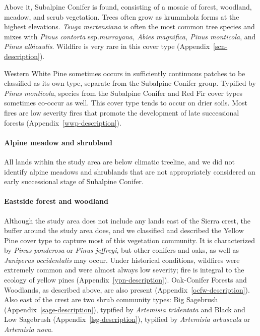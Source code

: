 Above it, Subalpine Conifer is found, consisting of a mosaic of forest, woodland, meadow, and scrub vegetation. Trees often grow as krummholz forms at the highest elevations. \emph{Tsuga mertensiana} is often the most common tree species and mixes with \emph{Pinus contorta} ssp.\@ \emph{murrayana, Abies magnifica, Pinus monticola}, and \emph{Pinus albicaulis}. Wildfire is very rare in this cover type (Appendix~\ref{scn-description}). 

Western White Pine sometimes occurs in sufficiently continuous patches to be classified as its own type, separate from the Subalpine Conifer group. Typified by \emph{Pinus monticola}, species from the Subalpine Conifer and Red Fir cover types sometimes co-occur as well. This cover type tends to occur on drier soils. Most fires are low severity fires that promote the development of late successional forests (Appendix~\ref{wwp-description}).


\paragraph{Alpine meadow and shrubland} All lands within the study area are below climatic treeline, and we did not identify alpine meadows and shrublands that are not appropriately considered an early successional stage of Subalpine Conifer.


\paragraph{Eastside forest and woodland} Although the study area does not include any lands east of the Sierra crest, the buffer around the study area does, and we classified and described the Yellow Pine cover type to capture most of this vegetation community. It is characterized by \emph{Pinus ponderosa} or \emph{Pinus jeffreyi}, but other conifers and oaks, as well as \emph{Juniperus occidentalis} may occur. Under historical conditions, wildfires were extremely common and were almost always low severity; fire is integral to the ecology of yellow pines (Appendix~\ref{ypn-description}). 
%
Oak-Conifer Forests and Woodlands, as described above, are also present (Appendix~\ref{ocfw-description}). 
%
Also east of the crest are two shrub community types: Big Sagebrush (Appendix~\ref{sage-description}), typified by \emph{Artemisia tridentata} and Black and Low Sagebrush (Appendix~\ref{lsg-description}), typified by \emph{Artemisia arbuscula} or \emph{Artemisia nova}. 


